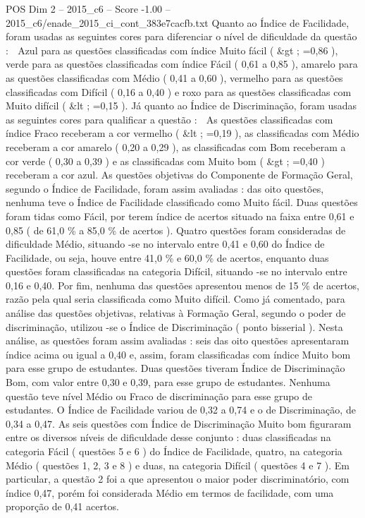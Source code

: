 \begin{textsample}{POS Dim 2 – 2015\_c6 – Score -1.00 – 2015\_c6/enade\_2015\_ci\_cont\_383e7cacfb.txt}
Quanto ao Índice de Facilidade, foram usadas as seguintes cores para diferenciar o nível de dificuldade da questão :  Azul para as questões classificadas com índice Muito fácil ( \&gt ; =0,86 ), verde para as questões classificadas com índice Fácil ( 0,61 a 0,85 ), amarelo para as questões classificadas com Médio ( 0,41 a 0,60 ), vermelho para as questões classificadas com Difícil ( 0,16 a 0,40 ) e roxo para as questões classificadas com Muito difícil ( \&lt ; =0,15 ).
Já quanto ao Índice de Discriminação, foram usadas as seguintes cores para qualificar a questão :  As questões classificadas com índice Fraco receberam a cor vermelho ( \&lt ; =0,19 ), as classificadas com Médio receberam a cor amarelo ( 0,20 a 0,29 ), as classificadas com Bom receberam a cor verde ( 0,30 a 0,39 ) e as classificadas com Muito bom ( \&gt ; =0,40 ) receberam a cor azul.
As questões objetivas do Componente de Formação Geral, segundo o Índice de Facilidade, foram assim avaliadas : das oito questões, nenhuma teve o Índice de Facilidade classificado como Muito fácil.
Duas questões foram tidas como Fácil, por terem índice de acertos situado na faixa entre 0,61 e 0,85 ( de 61,0 \% a 85,0 \% de acertos ).
Quatro questões foram consideradas de dificuldade Médio, situando -se no intervalo entre 0,41 e 0,60 do Índice de Facilidade, ou seja, houve entre 41,0 \% e 60,0 \% de acertos, enquanto duas questões foram classificadas na categoria Difícil, situando -se no intervalo entre 0,16 e 0,40.
Por fim, nenhuma das questões apresentou menos de 15 \% de acertos, razão pela qual seria classificada como Muito difícil.
Como já comentado, para análise das questões objetivas, relativas à Formação Geral, segundo o poder de discriminação, utilizou -se o Índice de Discriminação ( ponto bisserial ).
Nesta análise, as questões foram assim avaliadas : seis das oito questões apresentaram índice acima ou igual a 0,40 e, assim, foram classificadas com índice Muito bom para esse grupo de estudantes.
Duas questões tiveram Índice de Discriminação Bom, com valor entre 0,30 e 0,39, para esse grupo de estudantes.
Nenhuma questão teve nível Médio ou Fraco de discriminação para esse grupo de estudantes.
O Índice de Facilidade variou de 0,32 a 0,74 e o de Discriminação, de 0,34 a 0,47.
As seis questões com Índice de Discriminação Muito bom figuraram entre os diversos níveis de dificuldade desse conjunto : duas classificadas na categoria Fácil ( questões 5 e 6 ) do Índice de Facilidade, quatro, na categoria Médio ( questões 1, 2, 3 e 8 ) e duas, na categoria Difícil ( questões 4 e 7 ).
Em particular, a questão 2 foi a que apresentou o maior poder discriminatório, com índice 0,47, porém foi considerada Médio em termos de facilidade, com uma proporção de 0,41 acertos.

\end{textsample}
